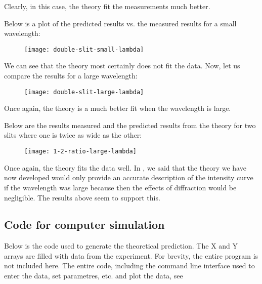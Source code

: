 \documentclass{paper}
\begin{document}
Clearly, in this case, the theory fit the measurements much better.

Below is a plot of the predicted results vs. the measured results for a small wavelength:

\begin{figure}[H]
\label{fig:double-slit-small-lambda}
    \texttt{[image: double-slit-small-lambda]}
\end{figure}

We can see that the theory most certainly does not fit the data.
Now, let us compare the results for a large wavelength:

\begin{figure}[H]
\label{fig:double-slit-large-lambda}
    \texttt{[image: double-slit-large-lambda]}
\end{figure}

Once again, the theory is a much better fit when the wavelength is
large.

Below are the results measured and the predicted results from the theory
for two slits where one is twice as wide as the other:

\begin{figure}[H]
\label{fig:1-2-ratio-large-lambda}
    \texttt{[image: 1-2-ratio-large-lambda]}
\end{figure}

Once again, the theory fits the data well.
In , we said that the theory we have now developed
would only provide an accurate description of the intensity curve if the wavelength was large because
then the effects of diffraction would be negligible.
The results above seem to support this.

\pagebreak

\begin{appendices}

\section{Code for computer simulation}
Below is the code used to generate the theoretical prediction. The X and Y arrays are filled with data from the experiment. For brevity, the entire program is not included here. The entire code, including the command line interface used to enter the data, set parametres, etc. and plot the data, see 


\end{appendices}

\pagebreak

\printbibliography
\end{document}
